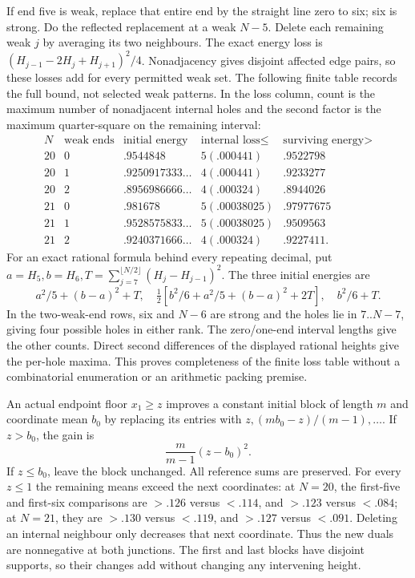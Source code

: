 \documentclass[11pt]{article}
\theoremstyle{definition}
\theoremstyle{remark}
\begin{document}
If end five is weak, replace that entire end by the straight line
zero to six; six is strong. Do the reflected replacement at a weak
$N-5$. Delete each remaining weak $j$ by averaging its two neighbours.
The exact energy loss is
$(H_{j-1}-2H_j+H_{j+1})^2/4$. Nonadjacency gives disjoint affected
edge pairs, so these losses add for every permitted weak set.
The following finite table records the full bound, not selected weak
patterns. In the loss column, count is the maximum number of
nonadjacent internal holes and the second factor is the maximum
quarter-square on the remaining interval:
\[
\begin{array}{c|c|c|c|c}
N&\text{weak ends}&\text{initial energy}&\text{internal loss}\le&
 \text{surviving energy}>\\\hline
20&0&.9544848&5(.000441)&.9522798\\
20&1&.9250917333\ldots&4(.000441)&.9233277\\
20&2&.8956986666\ldots&4(.000324)&.8944026\\
21&0&.981678&5(.00038025)&.97977675\\
21&1&.9528575833\ldots&5(.00038025)&.9509563\\
21&2&.9240371666\ldots&4(.000324)&.9227411 .
\end{array}
\]
For an exact rational formula behind every repeating decimal, put
$a=H_5,b=H_6,T=\sum_{j=7}^{\lfloor N/2\rfloor}(H_j-H_{j-1})^2$.
The three initial energies are
\[
 a^2/5+(b-a)^2+T,\quad
 \tfrac12[b^2/6+a^2/5+(b-a)^2+2T],\quad b^2/6+T.
\]
In the two-weak-end rows, six and $N-6$ are strong and the holes
lie in $7..N-7$, giving four possible holes in either rank.
The zero/one-end interval lengths give the other counts. Direct
second differences of the displayed rational heights give the
per-hole maxima. This proves completeness of the finite loss table
without a combinatorial enumeration or an arithmetic packing premise.

An actual endpoint floor $x_1\ge z$ improves a constant initial
block of length $m$ and coordinate mean $b_0$ by replacing its
entries with $z,(mb_0-z)/(m-1),\ldots$. If $z>b_0$, the gain is
\[
 {\frac{m}{ m-1}}(z-b_0)^2.
\]
If $z\le b_0$, leave the block unchanged. All reference sums are
preserved. For every $z\le1$ the remaining means exceed the next
coordinates: at $N=20$, the first-five and first-six comparisons
are $>.126$ versus $<.114$, and $>.123$ versus $<.084$;
at $N=21$, they are $>.130$ versus $<.119$, and $>.127$ versus
$<.091$. Deleting an internal neighbour only decreases that next
coordinate. Thus the new duals are nonnegative at both junctions.
The first and last blocks have disjoint supports, so their changes
add without changing any intervening height.
\end{document}
